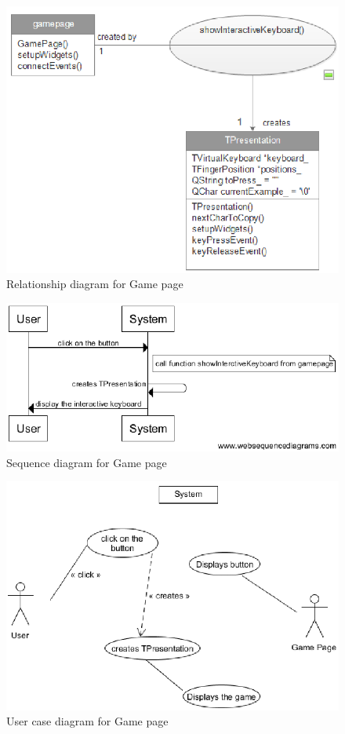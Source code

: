 \begin{figure}[h]
	\centering
    \includegraphics[width=12cm]{diagrams/Rgamepage.png}
    \caption{Relationship diagram for Game page}
    \label{Rgamepage}   
\end{figure}
\begin{figure}[h]
	\centering
    \includegraphics[width=12cm]{diagrams/Sgamepage.png}
    \caption{Sequence diagram for Game page}
    \label{Sgamepage}
\end{figure}
\begin{figure}[h]
	\centering
    \includegraphics[width=12cm]{diagrams/UCgamepage.png}
    \caption{User case diagram for Game page}
    \label{UCgamepage}
\end{figure}

